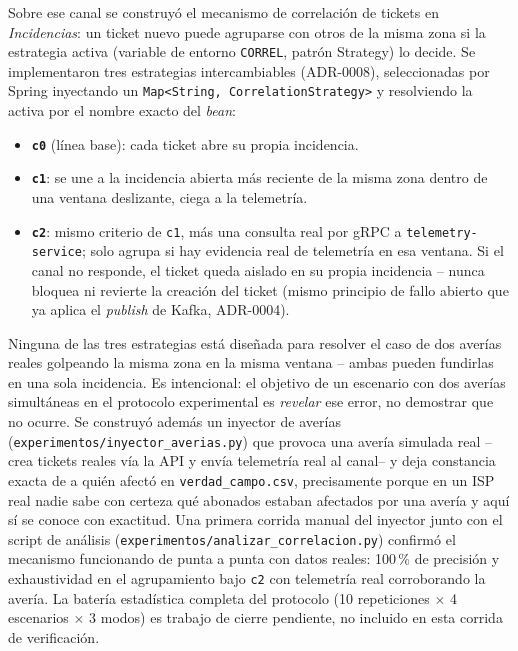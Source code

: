 Sobre ese canal se construyó el mecanismo de correlación de tickets en \emph{Incidencias}: un
ticket nuevo puede agruparse con otros de la misma zona si la estrategia activa (variable de
entorno \texttt{CORREL}, patrón Strategy) lo decide. Se implementaron tres estrategias
intercambiables (ADR-0008), seleccionadas por Spring inyectando un
\texttt{Map<String, CorrelationStrategy>} y resolviendo la activa por el nombre exacto del
\emph{bean}:

\begin{itemize}[nosep]
  \item \textbf{\texttt{c0}} (línea base): cada ticket abre su propia incidencia.
  \item \textbf{\texttt{c1}}: se une a la incidencia abierta más reciente de la misma zona dentro
        de una ventana deslizante, ciega a la telemetría.
  \item \textbf{\texttt{c2}}: mismo criterio de \texttt{c1}, más una consulta real por gRPC a
        \texttt{telemetry-service}; solo agrupa si hay evidencia real de telemetría en esa
        ventana. Si el canal no responde, el ticket queda aislado en su propia incidencia --
        nunca bloquea ni revierte la creación del ticket (mismo principio de fallo abierto que
        ya aplica el \emph{publish} de Kafka, ADR-0004).
\end{itemize}

Ninguna de las tres estrategias está diseñada para resolver el caso de dos averías reales
golpeando la misma zona en la misma ventana -- ambas pueden fundirlas en una sola incidencia. Es
intencional: el objetivo de un escenario con dos averías simultáneas en el protocolo experimental
es \emph{revelar} ese error, no demostrar que no ocurre. Se construyó además un inyector de
averías (\texttt{experimentos/inyector\_averias.py}) que provoca una avería simulada real
--crea tickets reales vía la API y envía telemetría real al canal-- y deja constancia exacta de
a quién afectó en \texttt{verdad\_campo.csv}, precisamente porque en un ISP real nadie sabe con
certeza qué abonados estaban afectados por una avería y aquí sí se conoce con exactitud. Una
primera corrida manual del inyector junto con el script de análisis
(\texttt{experimentos/analizar\_correlacion.py}) confirmó el mecanismo funcionando de punta a
punta con datos reales: 100\,\% de precisión y exhaustividad en el agrupamiento bajo \texttt{c2}
con telemetría real corroborando la avería. La batería estadística completa del protocolo (10
repeticiones $\times$ 4 escenarios $\times$ 3 modos) es trabajo de cierre pendiente, no incluido
en esta corrida de verificación.

